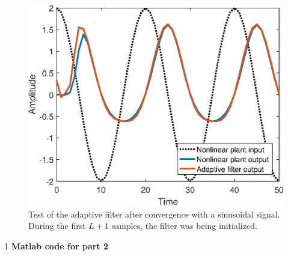 \documentclass[10pt]{article}
\def\SOLUTIONS{0} %
\begin{document}
\begin{enumerate}[label=(\alph*)]
{		\FloatBarrier
		\begin{figure}[h!]
			\centering
			\includegraphics[scale=0.8]{figs/part2_test.eps}
			\caption{Test of the adaptive filter after convergence with a sinusoidal signal. During the first $L+1$ samples, the filter was being initialized.}
			\label{fig:part2-test}
		\end{figure}
		\FloatBarrier
	}
	\fi
	
\end{enumerate}

\if\SOLUTIONS1
\textbf{Matlab code for part 2}

\fi
	
\end{document}
